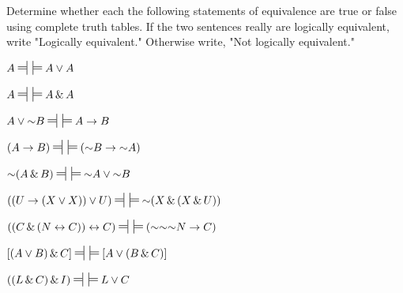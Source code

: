 \noindent\problempart
Determine whether each the following statements of equivalence are true or false using complete truth tables. If the two sentences really are logically equivalent, write "Logically equivalent." Otherwise write, "Not logically equivalent." 
\begin{earg}
\item $A\ndststile{}{} \hspace{.5em} \sdtstile{}{}A \eor A$\vspace{.5ex} 												%
\item $A\ndststile{}{} \hspace{.5em} \sdtstile{}{}A \eand A$\vspace{.5ex} 												%
\item $A \eor \enot B\ndststile{}{} \hspace{.5em} \sdtstile{}{}A\eif B$\vspace{.5ex} 									%
\item $(A \eif B)\ndststile{}{} \hspace{.5em} \sdtstile{}{}(\enot B \eif \enot A)$\vspace{.5ex} 							%
\item $\enot(A \eand B)\ndststile{}{} \hspace{.5em} \sdtstile{}{}\enot A \eor \enot B$ \vspace{.5ex}						%
\item $ ((U \eif (X \eor X)) \eor U) \ndststile{}{} \hspace{.5em} \sdtstile{}{} \enot (X \eand (X \eand U)) $\vspace{.5ex}	%
\item $ ((C \eand (N \eiff C)) \eiff C) \ndststile{}{} \hspace{.5em} \sdtstile{}{} (\enot \enot \enot N \eif C) $\vspace{.5ex}	%
\item $[(A \eor B) \eand C]\ndststile{}{} \hspace{.5em} \sdtstile{}{}[A \eor (B \eand C)]$\vspace{.5ex} 					%
\item $((L \eand C) \eand I)\ndststile{}{} \hspace{.5em} \sdtstile{}{}L \eor C$\vspace{.5ex}								%
\end{earg}


